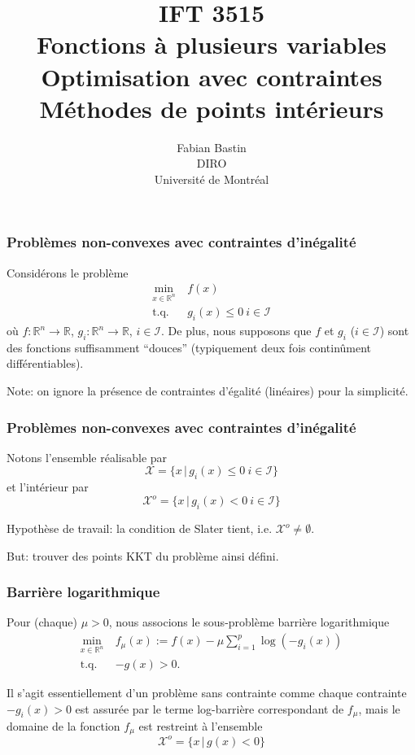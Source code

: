 \documentclass[usepdftitle=false,aspectratio=169]{beamer}
\title[IFT3515]{IFT 3515\\Fonctions à plusieurs variables\\Optimisation avec contraintes\\Méthodes de points intérieurs}
\author[Fabian Bastin]{Fabian Bastin\\DIRO\\Université de Montréal}
\date{}
\def\blue{\color{blue}}
\def\cI{\mathcal{I}}
\def\cX{\mathcal{X}}
\def\RR{\mathbb{R}}
\begin{document}
\frame{\titlepage}

\begin{frame}
\frametitle{Problèmes non-convexes avec contraintes d'inégalité}

Considérons le problème
\begin{align*}
\min_{x \in \RR^n}\ & f(x) \\
\mbox{t.q. } & g_i(x) \leq 0\ i \in \cI
\end{align*}
où $f: \RR^n \rightarrow \RR$, $g_i: \RR^n \rightarrow \RR$, $i \in \cI$. De plus, nous supposons que $f$ et $g_i$ ($i \in \cI$) sont des fonctions suffisamment ``douces'' (typiquement deux fois continûment différentiables).

\mbox{}

Note: on ignore la présence de contraintes d'égalité (linéaires) pour la simplicité.

\end{frame}

\begin{frame}
\frametitle{Problèmes non-convexes avec contraintes d'inégalité}

Notons l'ensemble réalisable par
$$
\cX = \{ x \,|\, g_i(x) \leq 0\ i \in \cI \}
$$
et l'intérieur par
$$
\cX^o = \{ x \,|\, g_i(x) < 0\ i \in \cI \}
$$

\mbox{}

{\blue Hypothèse de travail}: la condition de Slater tient, i.e. $\cX^o \ne \emptyset$.

\mbox{}

But: trouver des points KKT du problème ainsi défini.

\end{frame}

\begin{frame}
\frametitle{Barrière logarithmique}

Pour (chaque) $\mu > 0$, nous associons le sous-problème barrière logarithmique
\begin{align*}
\min_{x \in \RR^n}\ & f_\mu(x) := f(x) - \mu \sum_{i = 1}^p \log (-g_i(x)) \\
\mbox{t.q. } & -g(x) > 0.
\end{align*}

Il s'agit essentiellement d'un problème sans contrainte comme chaque contrainte $-g_i(x) > 0$ est assurée  par le terme log-barrière correspondant de $f_\mu$, mais le domaine de la fonction $f_{\mu}$ est restreint à l'ensemble
$$
\cX^o = \{ x \,|\, g(x) < 0 \}
$$

\end{frame}
\end{document}
